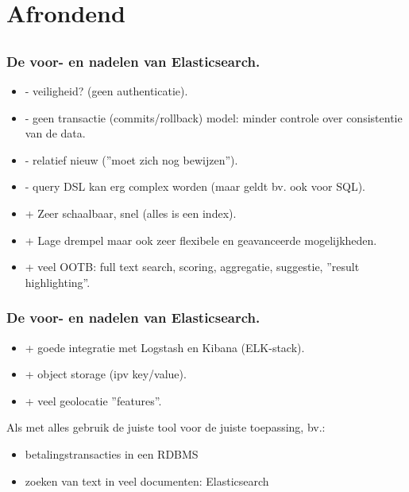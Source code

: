 \section{Afrondend}
\subsection{}
\begin{styleframe}
    \frametitle{De voor- en nadelen van Elasticsearch.}  
\begin{itemize}[<+>]
	\item - veiligheid? (geen authenticatie).
	\item - geen transactie (commits/rollback) model: minder controle over consistentie van de data.
	\item - relatief nieuw (''moet zich nog bewijzen'').
	\item - query DSL kan erg complex worden (maar geldt bv. ook voor SQL).
	\item + Zeer schaalbaar, snel (alles is een index).
	\item + Lage drempel maar ook zeer flexibele en geavanceerde mogelijkheden.
	\item + veel OOTB: full text search, scoring, aggregatie, suggestie, ''result highlighting''.
\end{itemize}
\end{styleframe}

\begin{styleframe}
    \frametitle{De voor- en nadelen van Elasticsearch.}  
\begin{itemize}[<+>]
	\item + goede integratie met Logstash en Kibana (ELK-stack).
	\item + object storage (ipv key/value).
	\item + veel geolocatie ''features''.
\end{itemize}
\pause
Als met alles gebruik de juiste tool voor de juiste toepassing, bv.:
\begin{itemize}[<+>]
	\item betalingstransacties in een RDBMS
	\item zoeken van text in veel documenten: Elasticsearch
\end{itemize}

\end{styleframe}

